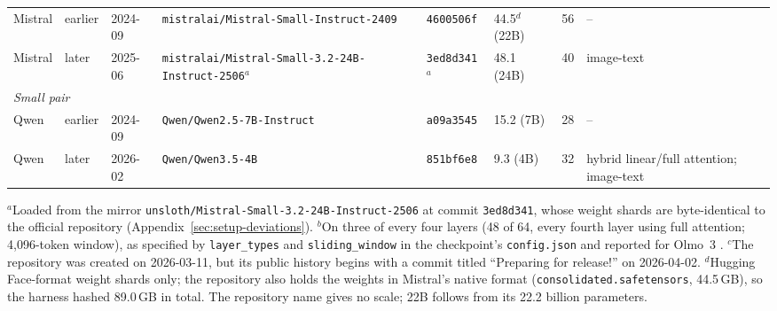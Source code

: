 \begin{table}[t]
{\begin{tabular}{@{}llllllr>{\raggedright\arraybackslash}p{3.1cm}@{}}
Mistral & earlier & 2024-09 & \texttt{mistralai/Mistral-Small-Instruct-2409}           & \texttt{4600506f} & 44.5$^{d}$ (22B) & 56 & -- \\
Mistral & later   & 2025-06 & \texttt{mistralai/Mistral-Small-3.2-24B-Instruct-2506}$^{a}$ & \texttt{3ed8d341}$^{a}$ & 48.1 (24B) & 40 & image-text \\
\midrule
\multicolumn{8}{l}{\emph{Small pair}} \\
Qwen    & earlier & 2024-09 & \texttt{Qwen/Qwen2.5-7B-Instruct}                        & \texttt{a09a3545} & 15.2 (7B) & 28 & -- \\
Qwen    & later   & 2026-02 & \texttt{Qwen/Qwen3.5-4B}                                 & \texttt{851bf6e8} & 9.3 (4B)  & 32 & hybrid linear/full attention; image-text \\
\bottomrule
\end{tabular}}

\smallskip
\footnotesize $^{a}$Loaded from the mirror
\texttt{unsloth/Mistral-Small-3.2-24B-Instruct-2506} at commit
\texttt{3ed8d341}, whose weight shards are byte-identical to the official
repository (Appendix~\ref{sec:setup-deviations}).
$^{b}$On three of every four layers (48 of 64, every fourth layer using full
attention; 4{,}096-token window), as specified by \texttt{layer\_types} and
\texttt{sliding\_window} in the checkpoint's \texttt{config.json} and reported
for Olmo~3 \cite{olmo2025olmo3}.
$^{c}$The repository was created on 2026-03-11, but its public history begins
with a commit titled ``Preparing for release!'' on 2026-04-02.
$^{d}$Hugging Face-format weight shards only; the repository also holds the
weights in Mistral's native format (\texttt{consolidated.safetensors},
44.5\,GB), so the harness hashed 89.0\,GB in total. The repository name gives
no scale; 22B follows from its 22.2 billion parameters.
\end{table}
